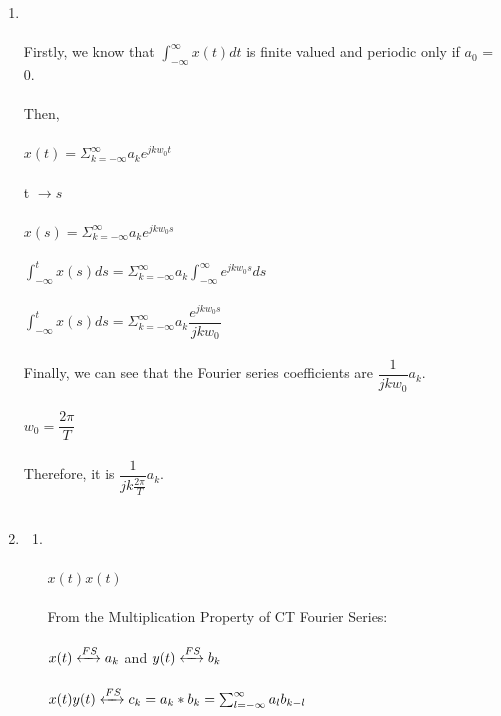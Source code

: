 \documentclass[10pt,a4paper, margin=1in]{article}
\begin{document}
\begin{enumerate}

\item %
    \\\\Firstly, we know that $\int_{-\infty}^{\infty}x(t)dt$ is finite valued and periodic only if $a_{0}$ = 0.
    \\\\Then,
    \\\\ $x(t) = \Sigma_{k=-\infty}^{\infty}a_{k}e^{jkw_{0}t} $
    \\\\t $\longrightarrow s$
    \\\\ $x(s) = \Sigma_{k=-\infty}^{\infty}a_{k}e^{jkw_{0}s}$
    \\\\ $\int_{-\infty}^{t}x(s)ds =\Sigma_{k=-\infty}^{\infty}a_{k}\int_{-\infty}^{\infty}e^{jkw_{0}s}ds$ 
    \\\\  $\int_{-\infty}^{t}x(s)ds =\Sigma_{k=-\infty}^{\infty}a_{k} \dfrac{e^{jk w_{0}s}}{jkw_{0}} $
    \\\\Finally, we can see that the Fourier series
coefficients are $\dfrac{1}{jk w_{0}}a_{k}.$
    \\\\ $w_{0} = \dfrac{2\pi}{T}$
    \\\\Therefore, it is $\dfrac{1}{jk \frac{2\pi}{T}}a_{k}.$
    \\\\
\item %
	\begin{enumerate}
    \item %
        \\\\ $x(t)x(t)$
        \\\\ From the Multiplication Property of CT Fourier Series:
        \\\\ $x(t) \xleftrightarrow{FS} a_k$ \hspace{25} and \hspace{25} $y(t) \xleftrightarrow{FS} b_k$
        \\\\ $x(t)y(t) \xleftrightarrow{FS} c_k = a_k*b_k = \sum_{l=-\infty}^{\infty} a_{l}b_{k-l} $

\end{enumerate}
\end{enumerate}
\end{document}
